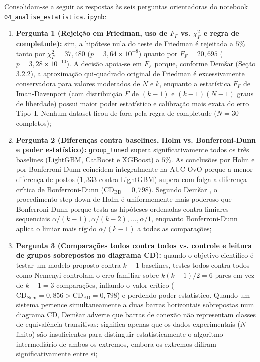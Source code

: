 \documentclass[11pt,a4paper]{article}
\begin{document}
Consolidam-se a seguir as respostas às seis perguntas orientadoras do notebook \texttt{04\_analise\_estatistica.ipynb}:
\begin{enumerate}[leftmargin=2em]
    \item \textbf{Pergunta 1 (Rejeição em Friedman, uso de $F_F$ vs. $\chi^2_F$ e regra de completude):} sim, a hipótese nula do teste de Friedman é rejeitada a $5\%$ tanto por $\chi^2_F = 37{,}480$ ($p = 3{,}64 \times 10^{-8}$) quanto por $F_F = 20{,}695$ ($p = 3{,}28 \times 10^{-10}$). A decisão apoia-se em $F_F$ porque, conforme Demšar \cite{demsar2006statistical} (Seção 3.2.2), a aproximação qui-quadrado original de Friedman é excessivamente conservadora para valores moderados de $N$ e $k$, enquanto a estatística $F_F$ de Iman-Davenport (com distribuição $F$ de $(k-1)$ e $(k-1)(N-1)$ graus de liberdade) possui maior poder estatístico e calibração mais exata do erro Tipo~I. Nenhum dataset ficou de fora pela regra de completude ($N = 30$ completos);
    \item \textbf{Pergunta 2 (Diferenças contra baselines, Holm vs. Bonferroni-Dunn e poder estatístico):} \texttt{group\_tuned} supera significativamente todos os três baselines (LightGBM, CatBoost e XGBoost) a $5\%$. As conclusões por Holm e por Bonferroni-Dunn coincidem integralmente na AUC OvO porque a menor diferença de postos ($1{,}333$ contra LightGBM) supera com folga a diferença crítica de Bonferroni-Dunn ($\mathrm{CD}_{\mathrm{BD}} = 0{,}798$). Segundo Demšar \cite{demsar2006statistical}, o procedimento step-down de Holm é uniformemente mais poderoso que Bonferroni-Dunn porque testa as hipóteses ordenadas contra limiares sequenciais $\alpha/(k-1), \alpha/(k-2), \dots, \alpha/1$, enquanto Bonferroni-Dunn aplica o limiar mais rígido $\alpha/(k-1)$ a todas as comparações;
    \item \textbf{Pergunta 3 (Comparações todos contra todos vs. controle e leitura de grupos sobrepostos no diagrama CD):} quando o objetivo científico é testar um modelo proposto contra $k-1$ baselines, testes todos contra todos como Nemenyi controlam o erro familiar sobre $k(k-1)/2 = 6$ pares em vez de $k-1 = 3$ comparações, inflando o valor crítico ($\mathrm{CD}_{\mathrm{Nem}} = 0{,}856 > \mathrm{CD}_{\mathrm{BD}} = 0{,}798$) e perdendo poder estatístico. Quando um sistema pertence simultaneamente a duas barras horizontais sobrepostas num diagrama CD, Demšar \cite{demsar2006statistical} adverte que barras de conexão não representam classes de equivalência transitivas: significa apenas que os dados experimentais ($N$ finito) são insuficientes para distinguir estatisticamente o algoritmo intermediário de ambos os extremos, embora os extremos difiram significativamente entre si;

\end{enumerate}
\end{document}
